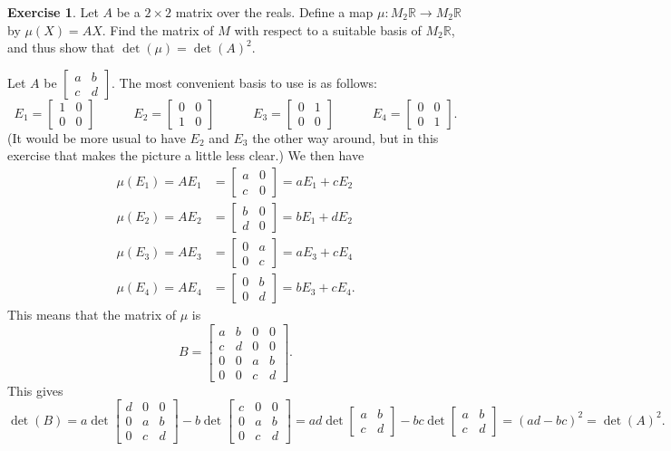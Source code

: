 \documentclass{amsart}
\newcommand{\R}         {{\mathbb{R}}}
\newcommand{\bpm}       {\left[\begin{matrix}}
\newcommand{\epm}       {\end{matrix}\right]}
\newcommand{\tm}        {\times}
\newcommand{\xra}       {\xrightarrow}
\renewcommand{\:}{\colon}
\theoremstyle{definition}
\newtheorem{exercise}{Exercise}
\newenvironment{solution}{{\noindent \bf Solution:}}{}
\begin{document}
\begin{exercise}
 Let $A$ be a $2\tm 2$ matrix over the reals.  Define a map
 $\mu\:M_2\R\xra{}M_2\R$ by $\mu(X)=AX$.  Find the matrix of
 $M$ with respect to a suitable basis of $M_2\R$, and thus
 show that $\det(\mu)=\det(A)^2$.
\end{exercise}
\begin{solution}
 Let $A$ be $\bpm a&b \\ c&d\epm$.  The most convenient
 basis to use is as follows:
 \[ E_1 = \bpm 1&0\\0&0\epm \hspace{3em}
    E_2 = \bpm 0&0\\1&0\epm \hspace{3em}
    E_3 = \bpm 0&1\\0&0\epm \hspace{3em}
    E_4 = \bpm 0&0\\0&1\epm.
 \]
 (It would be more usual to have $E_2$ and $E_3$ the other
 way around, but in this exercise that makes the picture a
 little less clear.)  We then have
 \begin{align*}
  \mu(E_1) = AE_1 &= \bpm a&0\\ c&0 \epm = aE_1+cE_2 \\
  \mu(E_2) = AE_2 &= \bpm b&0\\ d&0 \epm = bE_1+dE_2 \\
  \mu(E_3) = AE_3 &= \bpm 0&a\\ 0&c \epm = aE_3+cE_4 \\
  \mu(E_4) = AE_4 &= \bpm 0&b\\ 0&d \epm = bE_3+cE_4.
 \end{align*}
 This means that the matrix of $\mu$ is 
 \[ B = \bpm a & b & 0 & 0 \\
             c & d & 0 & 0 \\
             0 & 0 & a & b \\
             0 & 0 & c & d \epm.
 \]
 This gives 
 \[ \det(B) = 
     a \det\bpm d&0&0 \\ 0&a&b \\ 0&c&d \epm - 
     b \det\bpm c&0&0 \\ 0&a&b \\ 0&c&d \epm =
     ad\det\bpm a&b \\ c&d\epm - bc\det\bpm a&b\\ c&d\epm =
     (ad-bc)^2 = \det(A)^2.
 \]
\end{solution}

\end{document}

